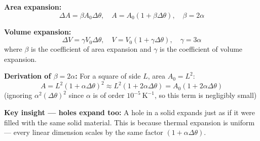 \begin{lawbox}
\textbf{Area expansion:}
\[
  \Delta A = \beta A_0 \Delta\theta, \quad
  A = A_0(1 + \beta\Delta\theta), \quad
  \beta = 2\alpha
\]

\textbf{Volume expansion:}
\[
  \Delta V = \gamma V_0 \Delta\theta, \quad
  V = V_0(1 + \gamma\Delta\theta), \quad
  \gamma = 3\alpha
\]
where $\beta$ is the coefficient of area expansion
and $\gamma$ is the coefficient of volume expansion.

\textbf{Derivation of $\beta = 2\alpha$:}
For a square of side $L$, area $A_0 = L^2$:
\[
  A = L^2(1+\alpha\Delta\theta)^2
  \approx L^2(1+2\alpha\Delta\theta)
  = A_0(1+2\alpha\Delta\theta)
\]
(ignoring $\alpha^2(\Delta\theta)^2$ since $\alpha$
is of order $10^{-5}\ \text{K}^{-1}$, so this term
is negligibly small)

\textbf{Key insight --- holes expand too:}
A hole in a solid expands just as if it were filled
with the same solid material. This is because
thermal expansion is uniform --- every linear
dimension scales by the same factor
$(1 + \alpha\Delta\theta)$.
\end{lawbox}

